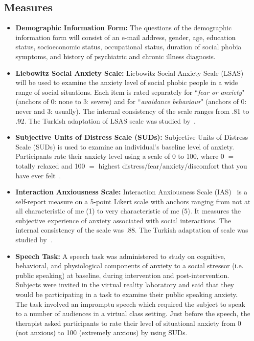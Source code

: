\documentclass{llncs}
\begin{document}
\subsection{Measures}
\begin{itemize}
\item \textbf{Demographic Information Form:} The questions of the demographic information form will consist of an e-mail address, gender, age, education status, socioeconomic status, occupational status, duration of social phobia symptoms, and history of psychiatric and chronic illness diagnosis.

\item \textbf{Liebowitz Social Anxiety Scale:} Liebowitz Social Anxiety Scale (LSAS)~\cite{liebowitz1987social} will be used to examine the anxiety level of social phobic people in a wide range of social situations. Each item is rated separately for ``\emph{fear or anxiety}" (anchors of 0: none to 3: severe) and for ``\emph{avoidance behaviour}" (anchors of 0: never and 3: usually). The internal consistency of the scale ranges from .81 to .92. The Turkish adaptation of LSAS scale was studied by~\cite{soykan2003liebowitz}. 

\item \textbf{Subjective Units of Distress Scale (SUDs):} Subjective Units of Distress Scale (SUDs) is used to examine an individual's baseline level of anxiety. Participants rate their anxiety level using a scale of 0 to 100, where 0 $=$ totally relaxed and 100 $=$ highest distress/fear/anxiety/discomfort that you have ever felt~\cite{wolpe2psychotherapy}. 

\item \textbf{Interaction Anxiousness Scale:} Interaction Anxiousness Scale (IAS)~\cite{leary1993interaction} is a self-report measure on a 5-point Likert scale with anchors ranging from not at all characteristic of me (1) to very characteristic of me (5). It measures the subjective experience of anxiety associated with social interactions. The internal consistency of the scale was .88. The Turkish adaptation of scale was studied by~\cite{cocskun2009etkilecsim}.

\item \textbf{Speech Task:} A speech task was administered to study on cognitive, behavioral, and physiological components of anxiety to a social stressor (i.e. public speaking) at baseline, during intervention and post-intervention. Subjects were invited in the virtual reality laboratory and said that they would be participating in a task to examine their public speaking anxiety. The task involved an impromptu speech which required the subject to speak to a number of audiences in a virtual class setting. Just before the speech, the therapist asked participants to rate their level of situational anxiety from 0 (not anxious) to 100 (extremely anxious) by using SUDs.

\end{itemize}
\end{document}
